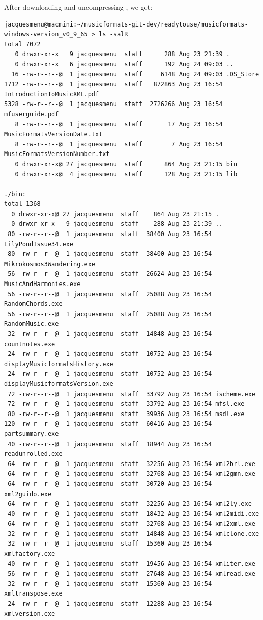 After downloading and uncompressing , we get:
\begin{lstlisting}[language=Terminal]
jacquesmenu@macmini:~/musicformats-git-dev/readytouse/musicformats-windows-version_v0_9_65 > ls -salR
total 7072
   0 drwxr-xr-x   9 jacquesmenu  staff      288 Aug 23 21:39 .
   0 drwxr-xr-x   6 jacquesmenu  staff      192 Aug 24 09:03 ..
  16 -rw-r--r--@  1 jacquesmenu  staff     6148 Aug 24 09:03 .DS_Store
1712 -rw-r--r--@  1 jacquesmenu  staff   872863 Aug 23 16:54 IntroductionToMusicXML.pdf
5328 -rw-r--r--@  1 jacquesmenu  staff  2726266 Aug 23 16:54 mfuserguide.pdf
   8 -rw-r--r--@  1 jacquesmenu  staff       17 Aug 23 16:54 MusicFormatsVersionDate.txt
   8 -rw-r--r--@  1 jacquesmenu  staff        7 Aug 23 16:54 MusicFormatsVersionNumber.txt
   0 drwxr-xr-x@ 27 jacquesmenu  staff      864 Aug 23 21:15 bin
   0 drwxr-xr-x@  4 jacquesmenu  staff      128 Aug 23 21:15 lib

./bin:
total 1368
  0 drwxr-xr-x@ 27 jacquesmenu  staff    864 Aug 23 21:15 .
  0 drwxr-xr-x   9 jacquesmenu  staff    288 Aug 23 21:39 ..
 80 -rw-r--r--@  1 jacquesmenu  staff  38400 Aug 23 16:54 LilyPondIssue34.exe
 80 -rw-r--r--@  1 jacquesmenu  staff  38400 Aug 23 16:54 Mikrokosmos3Wandering.exe
 56 -rw-r--r--@  1 jacquesmenu  staff  26624 Aug 23 16:54 MusicAndHarmonies.exe
 56 -rw-r--r--@  1 jacquesmenu  staff  25088 Aug 23 16:54 RandomChords.exe
 56 -rw-r--r--@  1 jacquesmenu  staff  25088 Aug 23 16:54 RandomMusic.exe
 32 -rw-r--r--@  1 jacquesmenu  staff  14848 Aug 23 16:54 countnotes.exe
 24 -rw-r--r--@  1 jacquesmenu  staff  10752 Aug 23 16:54 displayMusicformatsHistory.exe
 24 -rw-r--r--@  1 jacquesmenu  staff  10752 Aug 23 16:54 displayMusicformatsVersion.exe
 72 -rw-r--r--@  1 jacquesmenu  staff  33792 Aug 23 16:54 ischeme.exe
 72 -rw-r--r--@  1 jacquesmenu  staff  33792 Aug 23 16:54 mfsl.exe
 80 -rw-r--r--@  1 jacquesmenu  staff  39936 Aug 23 16:54 msdl.exe
120 -rw-r--r--@  1 jacquesmenu  staff  60416 Aug 23 16:54 partsummary.exe
 40 -rw-r--r--@  1 jacquesmenu  staff  18944 Aug 23 16:54 readunrolled.exe
 64 -rw-r--r--@  1 jacquesmenu  staff  32256 Aug 23 16:54 xml2brl.exe
 64 -rw-r--r--@  1 jacquesmenu  staff  32768 Aug 23 16:54 xml2gmn.exe
 64 -rw-r--r--@  1 jacquesmenu  staff  30720 Aug 23 16:54 xml2guido.exe
 64 -rw-r--r--@  1 jacquesmenu  staff  32256 Aug 23 16:54 xml2ly.exe
 40 -rw-r--r--@  1 jacquesmenu  staff  18432 Aug 23 16:54 xml2midi.exe
 64 -rw-r--r--@  1 jacquesmenu  staff  32768 Aug 23 16:54 xml2xml.exe
 32 -rw-r--r--@  1 jacquesmenu  staff  14848 Aug 23 16:54 xmlclone.exe
 32 -rw-r--r--@  1 jacquesmenu  staff  15360 Aug 23 16:54 xmlfactory.exe
 40 -rw-r--r--@  1 jacquesmenu  staff  19456 Aug 23 16:54 xmliter.exe
 56 -rw-r--r--@  1 jacquesmenu  staff  27648 Aug 23 16:54 xmlread.exe
 32 -rw-r--r--@  1 jacquesmenu  staff  15360 Aug 23 16:54 xmltranspose.exe
 24 -rw-r--r--@  1 jacquesmenu  staff  12288 Aug 23 16:54 xmlversion.exe


\end{lstlisting}
